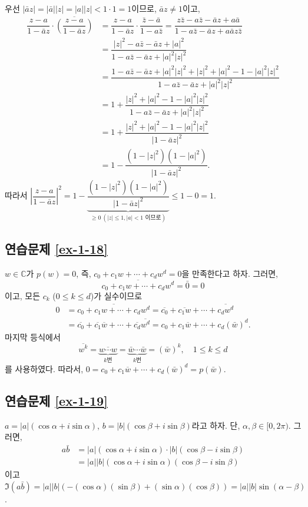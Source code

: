 우선 $|\bar az| = |\bar a||z| = |a||z| <1\cdot 1 =1$이므로, $\bar az \ne 1$이고,
\begin{align*}
\dfrac{z-a}{1-\bar az}\cdot \overline{\left(\dfrac{z-a}{1-\bar az}\right)}
&= \dfrac{z-a}{1-\bar az}\cdot \dfrac{\bar z-\bar a}{1-a\bar z}
= \dfrac{z\bar z - a\bar z - \bar a z+a\bar a}{1-a\bar z - \bar a z + a\bar a z \bar z} \\
&= \dfrac{|z|^2 - a\bar z - \bar a z + |a|^2}{1-a\bar z - \bar a z + |a|^2|z|^2} \\
&= \dfrac{1 - a\bar z - \bar a z + |a|^2|z|^2+|z|^2+|a|^2-1-|a|^2|z|^2}
{1-a\bar z - \bar a z + |a|^2|z|^2} \\
&= 1 + \dfrac{|z|^2+|a|^2-1-|a|^2|z|^2}{1-a\bar z - \bar a z + |a|^2|z|^2} \\
&= 1 + \dfrac{|z|^2+|a|^2-1-|a|^2|z|^2}{|1- \bar a z|^2} \\
&= 1 -  \dfrac{(1-|z|^2)(1-|a|^2)}{|1- \bar a z|^2}.
\end{align*}
따라서
$\left| \dfrac{z-a}{1-\bar az} \right|^2 = 1 -
\underbrace{\dfrac{(1-|z|^2)(1-|a|^2)}{|1- \bar a z|^2}}_{\ge0\ (|z|\le 1, |a|<1\text{ 이므로})}
\le 1-0 = 1$.

\subsection*{연습문제 \ref{ex-1-18}}

$w\in\mathbb C$가 $p(w)=0$, 즉,
$c_0 + c_1w + \cdots + c_dw^d=0$을 만족한다고 하자. 
그러면,
\[
\overline{c_0 + c_1w + \cdots + c_dw^d} = \bar 0 = 0
\]
이고, 모든 $c_k$ ($0\le k\le d$)가 실수이므로
\begin{align*}
0 & = \overline{c_0 + c_1w + \cdots + c_dw^d} 
= \overline{c_0} + \overline{c_1w} + \cdots + \overline{c_dw^d} \\
&= \overline{c_0} + \overline{c_1}\overline{w} + \cdots + \overline{c_d}\overline{w^d}
= c_0 + c_1\overline{w} + \cdots + c_d(\bar w)^d.
\end{align*}
마지막 등식에서 
\[
\overline{w^k} = \underbrace{\overline{w\cdots w}}_{k\text{번}}
= \underbrace{\bar w \cdots \bar w}_{k\text{번}}
= (\bar w)^k,
\quad 1\le k \le d
\]
를 사용하였다.
따라서, $0=c_0 + c_1\overline{w} + \cdots + c_d(\bar w)^d = p(\bar w)$.

\subsection*{연습문제 \ref{ex-1-19}}

$a = |a|(\cos\alpha + i\sin\alpha)$, 
$b = |b|(\cos\beta + i\sin \beta)$라고 하자.
단, $\alpha, \beta \in [0,2\pi)$. 그러면,
\begin{align*}
a\bar b &= |a|(\cos\alpha + i\sin\alpha)\cdot
|b|(\cos\beta - i\sin \beta) \\
&=|a||b|(\cos\alpha + i\sin\alpha)(\cos\beta - i\sin \beta)
\end{align*}
이고 $\Im(a\bar b) = |a||b|(-(\cos\alpha)(\sin\beta) + (\sin\alpha)(\cos\beta))
= |a||b|\sin(\alpha-\beta)$.

